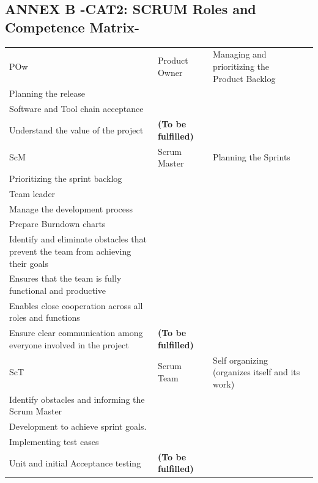 \documentclass{template/openetcs_article}
\begin{document}
\begin{landscape}
\subsection{ANNEX B -CAT2: SCRUM Roles and Competence Matrix-}
\begin{flushleft}
\begin{supertabular}[H]{|m{1cm}|m{4cm}|m{12cm}|m{7,5cm}|}
\hline
POw &
Product Owner &
\raggedright
Managing and prioritizing the Product Backlog\\
Planning the release\\
Software and Tool chain acceptance\\
Understand the value of the project
&
\textbf{(To be fulfilled)} \\\hline
ScM &
Scrum Master &
\raggedright
Planning the Sprints\\
Prioritizing the sprint backlog\\
Team leader\\
Manage the development process \\
Prepare Burndown charts\\
Identify and eliminate obstacles that prevent the team from achieving their goals \\
Ensures that the team is fully functional and productive\\
Enables close cooperation across all roles and functions\\
Ensure clear communication among everyone involved in the project
&
\textbf{(To be fulfilled)} \\\hline
ScT &
Scrum Team &
\raggedright
Self organizing (organizes itself and its work)\\
Identify obstacles and informing the Scrum Master \\
Development to achieve sprint goals.\\ 
Implementing test cases \\
Unit and initial Acceptance testing 
&
\textbf{(To be fulfilled)} \\\hline
\end{supertabular}
\end{flushleft}


\end{landscape}
\end{document}
